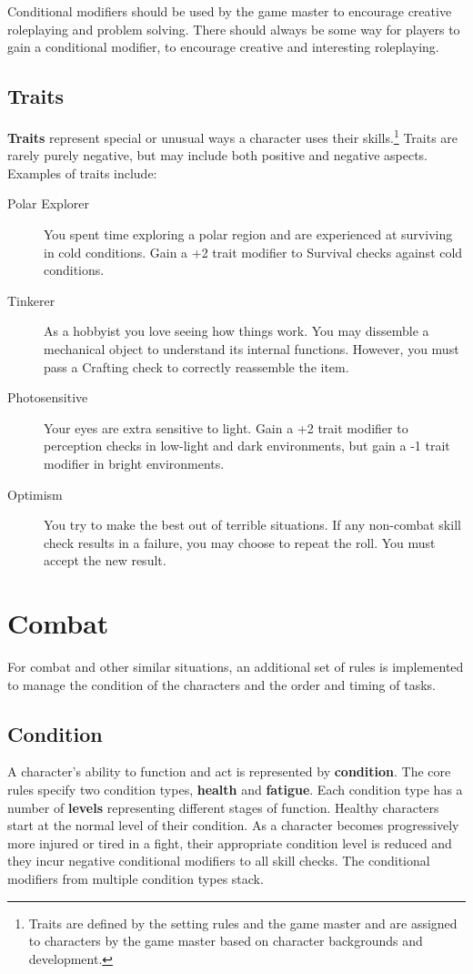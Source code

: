 \documentclass[11pt]{article}
\begin{document}
Conditional modifiers should be used by the game master to encourage creative roleplaying and problem solving.
There should always be some way for players to gain a conditional modifier, to encourage creative and interesting roleplaying.

\subsection{Traits}
\textbf{Traits} represent special or unusual ways a character uses their skills.\footnote{Traits are defined by the setting rules and the game master and are assigned to characters by the game master based on character backgrounds and development.}
Traits are rarely purely negative, but may include both positive and negative aspects.
Examples of traits include:

\begin{description}
	\item[Polar Explorer]You spent time exploring a polar region and are experienced at surviving in cold conditions.
	Gain a +2 trait modifier to Survival checks against cold conditions.
	\item[Tinkerer]As a hobbyist you love seeing how things work.
	You may dissemble a mechanical object to understand its internal functions.
	However, you must pass a Crafting check to correctly reassemble the item.
	\item[Photosensitive]Your eyes are extra sensitive to light.
	Gain a +2 trait modifier to perception checks in low-light and dark environments, but gain a -1 trait modifier in bright environments.
	\item[Optimism]You try to make the best out of terrible situations.
If any non-combat skill check results in a failure, you may choose to repeat the roll.
You must accept the new result.
\end{description}

\section{Combat}
For combat and other similar situations, an additional set of rules is implemented to manage the condition of the characters and the order and timing of tasks.

\subsection{Condition}
A character's ability to function and act is represented by \textbf{condition}.
The core rules specify two condition types, \textbf{health} and \textbf{fatigue}.
Each condition type has a number of \textbf{levels} representing different stages of function.
Healthy characters start at the normal level of their condition.
As a character becomes progressively more injured or tired in a fight, their appropriate condition level is reduced and they incur negative conditional modifiers to all skill checks.
The conditional modifiers from multiple condition types stack.
\end{document}
